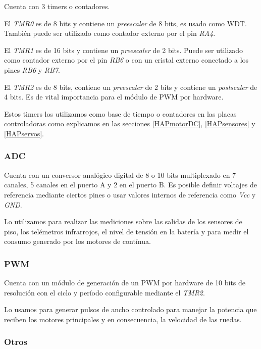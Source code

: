 Cuenta con 3 timers o contadores.

El \emph{TMR0} es de 8 bits y contiene un \emph{preescaler} de 8 bits, es usado como WDT.
Tambi\'en puede ser utilizado como contador externo por el pin \emph{RA4}.

El \emph{TMR1} es de 16 bits y contiene un \emph{preescaler} de 2 bits.
Puede ser utilizado como contador externo por el pin \emph{RB6} o con un cristal externo conectado a los pines \emph{RB6} y \emph{RB7}.

El \emph{TMR2} es de 8 bits, contiene un \emph{preescaler} de 2 bits y contiene un \emph{postscaler} de 4 bits.
Es de vital importancia para el m\'odulo de PWM por hardware.

Estos timers los utilizamos como base de tiempo o contadores en las placas controladoras como explicamos en las secciones \ref{HAPmotorDC},
\ref{HAPsensores} y \ref{HAPservos}.

\subsubsection{ADC}
\label{adc}

Cuenta con un conversor anal\'ogico digital de 8 o 10 bits multiplexado en 7 canales, 5 canales en el puerto A y 2 en el puerto B.
Es posible definir voltajes de referencia mediante ciertos pines o usar valores internos de referencia como \emph{Vcc} y \emph{GND}.

Lo utilizamos para realizar las mediciones sobre las salidas de los sensores de piso, los tel\'emetros infrarrojos, el nivel de tensi\'on en la bater\'ia
y para medir el consumo generado por los motores de cont\'inua.

\subsubsection{PWM}
\label{pwm}

Cuenta con un m\'odulo de generaci\'on de un PWM por hardware de 10 bits de resoluci\'on con el ciclo y per\'iodo configurable mediante el \emph{TMR2}.

Lo usamos para generar pulsos de ancho controlado para manejar la potencia que reciben los motores principales y en consecuencia, la velocidad de las ruedas.

\subsubsection{Otros}
\label{otros}

